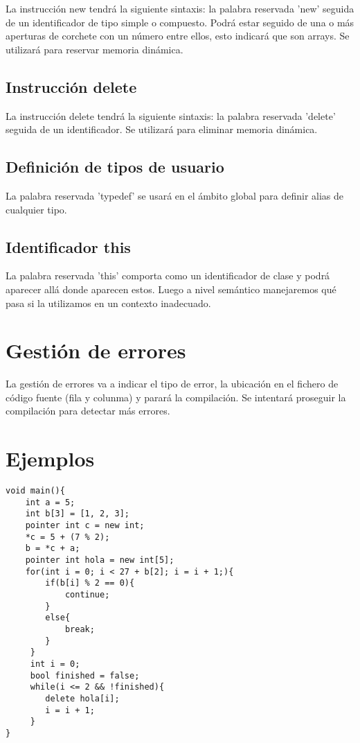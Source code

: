 \documentclass{article}
\begin{document}
La instrucción new tendrá la siguiente sintaxis: la palabra reservada 'new' seguida de un identificador de tipo simple o compuesto. Podrá estar seguido de una o más aperturas de corchete con un número entre ellos, esto indicará que son arrays. Se utilizará para reservar memoria dinámica.

\subsection{Instrucción delete}

La instrucción delete tendrá la siguiente sintaxis: la palabra reservada 'delete' seguida de un identificador. Se utilizará para eliminar memoria dinámica.

\subsection{Definición de tipos de usuario}
La palabra reservada 'typedef' se usará en el ámbito global para definir alias de cualquier tipo.

\subsection{Identificador this}

La palabra reservada 'this' comporta como un identificador de clase y podrá aparecer allá donde aparecen estos. Luego a nivel semántico manejaremos qué pasa si la utilizamos en un contexto inadecuado.


\section{Gestión de errores}
La gestión de errores va a indicar el tipo de error, la ubicación en el fichero de código fuente (fila y colunma) y parará la compilación. Se intentará proseguir la compilación para detectar más errores.

\section{Ejemplos}


\begin{lstlisting}[style=CStyle]
void main(){
    int a = 5;
    int b[3] = [1, 2, 3];
    pointer int c = new int;
    *c = 5 + (7 % 2);
    b = *c + a;
    pointer int hola = new int[5];
    for(int i = 0; i < 27 + b[2]; i = i + 1;){
        if(b[i] % 2 == 0){
            continue;
        }
        else{
            break;
        }
     }
     int i = 0;
     bool finished = false;
     while(i <= 2 && !finished){
        delete hola[i];
        i = i + 1;
     }
}
\end{lstlisting}
\end{document}
